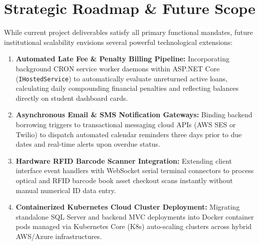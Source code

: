 \documentclass[11pt,a4paper]{report}
\begin{document}
\section{Strategic Roadmap \& Future Scope}
While current project deliverables satisfy all primary functional mandates, future institutional scalability envisions several powerful technological extensions:
\begin{enumerate}[leftmargin=1.5em]
    \item \textbf{Automated Late Fee \& Penalty Billing Pipeline:} Incorporating background CRON service worker daemons within ASP.NET Core (\texttt{IHostedService}) to automatically evaluate unreturned active loans, calculating daily compounding financial penalties and reflecting balances directly on student dashboard cards.
    \item \textbf{Asynchronous Email \& SMS Notification Gateways:} Binding backend borrowing triggers to transactional messaging cloud APIs (AWS SES or Twilio) to dispatch automated calendar reminders three days prior to due dates and real-time alerts upon overdue status.
    \item \textbf{Hardware RFID Barcode Scanner Integration:} Extending client interface event handlers with WebSocket serial terminal connectors to process optical and RFID barcode book asset checkout scans instantly without manual numerical ID data entry.
    \item \textbf{Containerized Kubernetes Cloud Cluster Deployment:} Migrating standalone SQL Server and backend MVC deployments into Docker container pods managed via Kubernetes Core (K8s) auto-scaling clusters across hybrid AWS/Azure infrastructures.
\end{enumerate}
\end{document}
